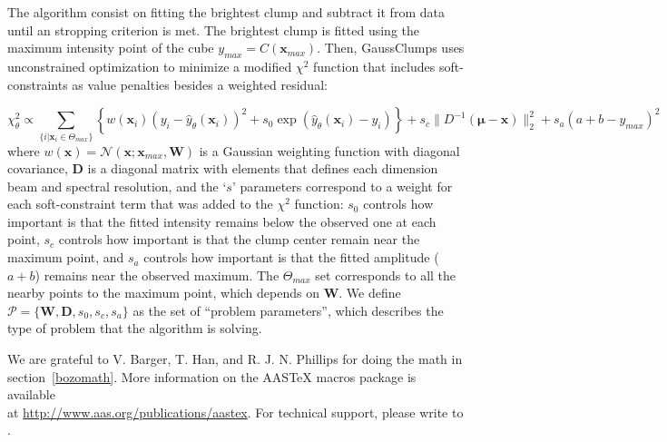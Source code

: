 \documentclass[manuscript]{aastex}
\newcommand{\vl}[1]{{\mathbf #1}}
\newcommand{\vs}[1]{{\boldsymbol #1}}
\begin{document}
The algorithm consist on fitting the brightest clump and subtract it from data
until an stropping criterion is met. The brightest clump is fitted using
the maximum intensity point of the cube $y_{max} = C(\vl{x}_{max})$.
Then, GaussClumps uses unconstrained optimization to minimize a modified
$\chi^2$ function that includes soft-constraints as value penalties
besides a weighted residual:

\footnotesize
\begin{equation}
\chi^2_\theta \propto \sum_{\{i | \vl{x}_i \in \Theta_{max} \}} \left\{ w(\vl{x}_i)(y_i -
\hat{y}_\theta(\vl{x}_i))^2  +
s_0 \exp( \hat{y}_\theta(\vl{x}_i) - y_i) \right\} + s_c \|D^{-1}(\vs{\mu} - \vl{x}) \|_2^2 
+ s_a\left(a + b - y_{max}\right)^2
\end{equation}
\normalsize
where
$w(\vl{x})=\mathcal{N}(\vl{x};\vl{x}_{max},\vl{W})$ is a Gaussian
weighting function with diagonal covariance, $\vl{D}$ is a diagonal matrix with elements
that defines each dimension beam and spectral resolution, and
the `$s$' parameters correspond to a weight for 
each soft-constraint term that was added to the $\chi^2$ function: 
$s_0$ controls how important is that the fitted intensity remains below the
observed one at each point, $s_c$ controls how important is that the clump center remain near the
maximum point, and $s_a$ controls how important is that the fitted amplitude
($a+b$) remains near the observed maximum. The $\Theta_{max}$ set corresponds to
all the nearby points to the maximum point, which depends on $\vl{W}$.
We define $\mathcal{P}=\{\vl{W},\vl{D},s_0,s_c,s_a\}$
as the set of ``problem parameters'', which describes the type of problem 
that the algorithm is solving.


\acknowledgments

We are grateful to V. Barger, T. Han, and R. J. N. Phillips for
doing the math in section~\ref{bozomath}.
More information on the AASTeX macros package is available \\ at
\url{http://www.aas.org/publications/aastex}.
For technical support, please write to
.
\end{document}
